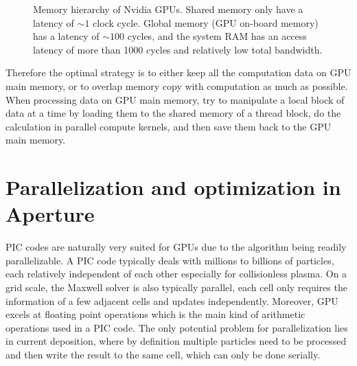 \begin{figure}[h]
  \centering
  \caption[Memory hierarchy of Nvidia GPUs.]{Memory hierarchy of Nvidia GPUs.
    Shared memory only have a latency of $\sim 1$ clock cycle. Global memory
    (GPU on-board memory) has a latency of $\sim 100$ cycles, and the system RAM
    has an access latency of more than 1000 cycles and relatively low total
    bandwidth.}
  \label{fig:gpu-memory}
\end{figure}

Therefore the optimal strategy is to either keep all the computation data on GPU
main memory, or to overlap memory copy with computation as much as possible.
When processing data on GPU main memory, try to manipulate a local block of data
at a time by loading them to the shared memory of a thread block, do the
calculation in parallel compute kernels, and then save them back to the GPU main
memory.

\section{Parallelization and optimization in Aperture}
\label{sec:optimization}

PIC codes are naturally very suited for GPUs due to the algorithm being readily
parallelizable. A PIC code typically deals with millions to billions of
particles, each relatively independent of each other especially for
collisionless plasma. On a grid scale, the Maxwell solver is also typically
parallel, each cell only requires the information of a few adjacent cells and
updates independently. Moreover, GPU excels at floating point operations which
is the main kind of arithmetic operations used in a PIC code. The only
potential problem for parallelization lies in current deposition, where by
definition multiple particles need to be processed and then write the result to
the same cell, which can only be done serially.

